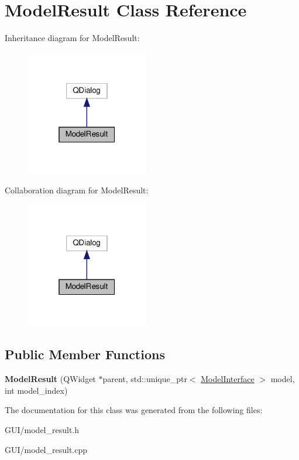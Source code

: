 \hypertarget{classModelResult}{}\section{Model\+Result Class Reference}
\label{classModelResult}


Inheritance diagram for Model\+Result\+:\nopagebreak
\begin{figure}[H]
\begin{center}
\leavevmode
\includegraphics[width=151pt]{classModelResult__inherit__graph}
\end{center}
\end{figure}


Collaboration diagram for Model\+Result\+:\nopagebreak
\begin{figure}[H]
\begin{center}
\leavevmode
\includegraphics[width=151pt]{classModelResult__coll__graph}
\end{center}
\end{figure}
\subsection*{Public Member Functions}
\begin{DoxyCompactItemize}
\item 
\mbox{\label{classModelResult_a1dac642410c22e0d6c2c8e036336b546}} 
{\bfseries Model\+Result} (Q\+Widget $\ast$parent, std\+::unique\+\_\+ptr$<$ \hyperlink{classModelInterface}{Model\+Interface} $>$ model, int model\+\_\+index)
\end{DoxyCompactItemize}


The documentation for this class was generated from the following files\+:\begin{DoxyCompactItemize}
\item 
G\+U\+I/model\+\_\+result.\+h\item 
G\+U\+I/model\+\_\+result.\+cpp\end{DoxyCompactItemize}
